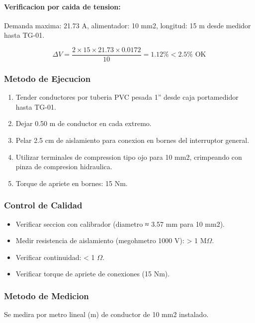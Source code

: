 \paragraph{Verificacion por caida de tension:}
Demanda maxima: 21.73 A, alimentador: 10 mm2, longitud: 15 m desde medidor hasta TG-01.

\begin{equation}
\Delta V = \frac{2 \times 15 \times 21.73 \times 0.0172}{10} = 1.12\% < 2.5\% \text{ OK}
\end{equation}

\subsubsection{Metodo de Ejecucion}

\begin{enumerate}
  \item Tender conductores por tuberia PVC pesada 1'' desde caja portamedidor hasta TG-01.
  \item Dejar 0.50 m de conductor en cada extremo.
  \item Pelar 2.5 cm de aislamiento para conexion en bornes del interruptor general.
  \item Utilizar terminales de compression tipo ojo para 10 mm2, crimpeando con pinza de compresion hidraulica.
  \item Torque de apriete en bornes: 15 Nm.
\end{enumerate}

\subsubsection{Control de Calidad}

\begin{itemize}
  \item Verificar seccion con calibrador (diametro ≈ 3.57 mm para 10 mm2).
  \item Medir resistencia de aislamiento (megohmetro 1000 V): > 1 M$\Omega$.
  \item Verificar continuidad: < 1 $\Omega$.
  \item Verificar torque de apriete de conexiones (15 Nm).
\end{itemize}

\subsubsection{Metodo de Medicion}

Se medira por metro lineal (m) de conductor de 10 mm2 instalado.

